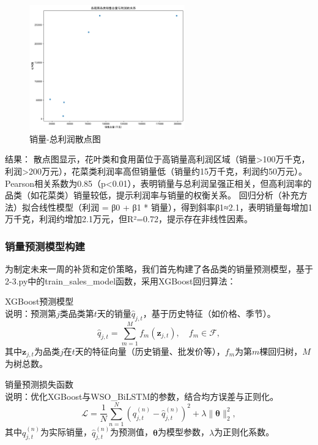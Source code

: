 \documentclass{cumcmthesis} %
\begin{document}
\begin{enumerate}
        \begin{figure}[H]
            \centering
            \includegraphics[width=0.6\textwidth]{fig/sales_profit_scatter.png}
            \caption{销量-总利润散点图}
            \label{fig:scatter}
        \end{figure}

        结果：
        散点图显示，花叶类和食用菌位于高销量高利润区域（销量>100万千克，利润>200万元），花菜类利润率高但销量低（销量约15万千克，利润约50万元）。
        Pearson相关系数为0.85（p<0.01），表明销量与总利润呈强正相关，但高利润率的品类（如花菜类）销量较低，提示利润率与销量的权衡关系。
        回归分析（补充方法）拟合线性模型（利润 = β0 + β1 * 销量），得到斜率β1≈2.1，表明销量每增加1万千克，利润约增加2.1万元，但R²=0.72，提示存在非线性因素。
    
\end{enumerate}

\subsubsection{销量预测模型构建}
为制定未来一周的补货和定价策略，我们首先构建了各品类的销量预测模型，基于2-3.py中的train\_sales\_model函数，采用XGBoost回归算法：

XGBoost预测模型 \\
   说明：预测第$j$类品类第$t$天的销量$\hat{q}_{j,t}$，基于历史特征（如价格、季节）。
   \begin{equation}
   \hat{q}_{j,t} = \sum_{m=1}^M f_m(\boldsymbol{z}_{j,t}), \quad f_m \in \mathcal{F},
   \end{equation}
   其中$\boldsymbol{z}_{j,t}$为品类$j$在$t$天的特征向量（历史销量、批发价等），$f_m$为第$m$棵回归树，$M$为树总数。

销量预测损失函数 \\
   说明：优化XGBoost与WSO\_BiLSTM的参数，结合均方误差与正则化。
   \begin{equation}
   \mathcal{L} = \frac{1}{N} \sum_{n=1}^N (q_{j,t}^{(n)} - \hat{q}_{j,t}^{(n)})^2 + \lambda \|\boldsymbol{\theta}\|_2^2,
   \end{equation}
   其中$q_{j,t}^{(n)}$为实际销量，$\hat{q}_{j,t}^{(n)}$为预测值，$\boldsymbol{\theta}$为模型参数，$\lambda$为正则化系数。   
   
\end{document}
